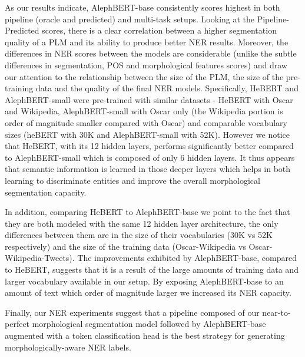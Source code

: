 \documentclass[11pt,a4paper]{article}
\begin{document}
As our results indicate, AlephBERT-base consistently scores highest in both pipeline (oracle and predicted) and multi-task setups.
Looking at the Pipeline-Predicted scores, there is a clear correlation between a higher segmentation quality of a PLM and its ability to produce better NER results.
Moreover, the differences in NER scores between the models are considerable (unlike the subtle differences in segmentation, POS and morphological features scores) and draw our attention to the relationship between the size of the PLM, the size of the pre-training data and the quality of the final NER models.
Specifically, HeBERT and AlephBERT-small were pre-trained with similar datasets - HeBERT with Oscar and Wikipedia, AlephBERT-small with Oscar only (the Wikipedia portion is order of magnitude smaller compared with Oscar) and comparable vocabulary sizes (heBERT with 30K and AlephBERT-small with 52K). 
However we notice that HeBERT, with its 12 hidden layers,  performs significantly better compared to AlephBERT-small which is composed of only 6 hidden layers. It thus appears that semantic information is learned in those deeper layers which helps in both learning to discriminate entities  and improve the overall morphological segmentation capacity.

In addition, comparing HeBERT to AlephBERT-base we point to the fact that they are both modeled with the same 12 hidden layer architecture, the only differences between them are in the size of their vocabularies (30K vs 52K respectively) and the size of the training data (Oscar-Wikipedia vs Oscar-Wikipedia-Tweets). The improvements exhibited by AlephBERT-base, compared to HeBERT, suggests that it is  a result of the large amounts of training data and larger vocabulary available in our setup. By exposing AlephBERT-base to an amount of text which order of magnitude larger we increased its NER capacity.

Finally, our NER experiments suggest that a pipeline composed of our near-to-perfect morphological segmentation model followed by AlephBERT-base augmented with a token classification head is the best strategy for generating morphologically-aware NER labels.
\end{document}
